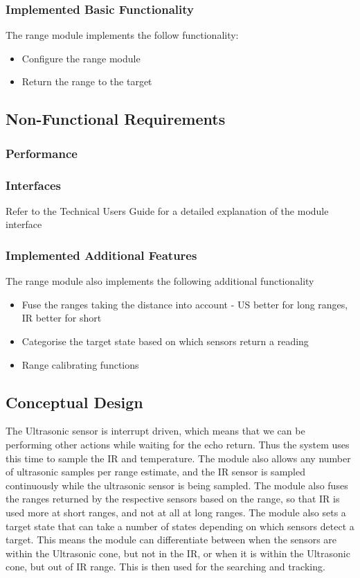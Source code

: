\documentclass[]{report}
\begin{document}
\subsubsection{Implemented Basic Functionality}
The range module implements the follow functionality:
\begin{itemize}
	\item Configure the range module
	\item Return the range to the target
\end{itemize}

\subsection{Non-Functional Requirements}
\subsubsection{Performance}

\subsubsection{Interfaces}
Refer to the Technical Users Guide for a detailed explanation of the module interface

\subsubsection{Implemented Additional Features}
The range module also implements the following additional functionality
\begin{itemize}
	\item Fuse the ranges taking the distance into account - US better for long ranges, IR better for short
	\item Categorise the target state based on which sensors return a reading
	\item Range calibrating functions
\end{itemize}

\subsection{Conceptual Design}
The Ultrasonic sensor is interrupt driven, which means that we can be performing other actions while waiting for the echo return. Thus the system uses this time to sample the IR and temperature. The module also allows any number of ultrasonic samples per range estimate, and the IR sensor is sampled continuously while the ultrasonic sensor is being sampled. The module also fuses the ranges returned by the respective sensors based on the range, so that IR is used more at short ranges, and not at all at long ranges. The module also sets a target state that can take a number of states depending on which sensors detect a target. This means the module can differentiate between when the sensors are within the Ultrasonic cone, but not in the IR, or when it is within the Ultrasonic cone, but out of IR range. This is then used for the searching and tracking.
\end{document}

